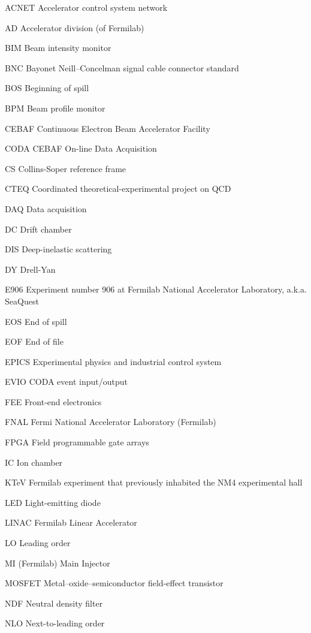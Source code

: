 \documentclass[edeposit,fullpage]{uiucthesis2009}
\begin{document}
\begin{symbollist*}
	\item[ACNET] Accelerator control system network
	\item[AD] Accelerator division (of Fermilab)
	\item[BIM] Beam intensity monitor
	\item[BNC] Bayonet Neill–Concelman signal cable connector standard
	\item[BOS] Beginning of spill
	\item[BPM] Beam profile monitor
	\item[CEBAF] Continuous Electron Beam Accelerator Facility
	\item[CODA] CEBAF On-line Data Acquisition
	\item[CS] Collins-Soper reference frame
	\item[CTEQ] Coordinated theoretical-experimental project on QCD
	\item[DAQ] Data acquisition
	\item[DC] Drift chamber
	\item[DIS] Deep-inelastic scattering
	\item[DY] Drell-Yan
	\item[E906] Experiment number 906 at Fermilab National Accelerator Laboratory, a.k.a. SeaQuest
	\item[EOS] End of spill
	\item[EOF] End of file
	\item[EPICS] Experimental physics and industrial control system
	\item[EVIO] CODA event input/output
	\item[FEE] Front-end electronics
	\item[FNAL] Fermi National Accelerator Laboratory (Fermilab)
	\item[FPGA] Field programmable gate arrays
	\item[IC] Ion chamber
	\item[KTeV] Fermilab experiment that previously inhabited the NM4 experimental hall
	\item[LED] Light-emitting diode
	\item[LINAC] Fermilab Linear Accelerator
	\item[LO] Leading order
	\item[MI] (Fermilab) Main Injector
	\item[MOSFET] Metal–oxide–semiconductor field-effect transistor
	\item[NDF] Neutral density filter
	\item[NLO] Next-to-leading order

\end{symbollist*}
\end{document}
